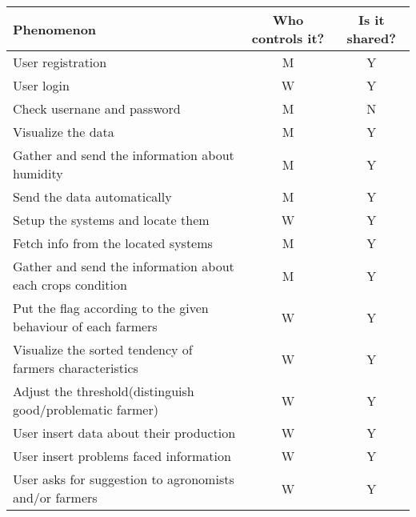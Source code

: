 \begin{table}[H]
    \setlength\arrayrulewidth{1pt}
    \centering
    \begin{tabular}{|l|c|c|}
        \rowcolor{myblue}
        \hline
        \color{white}Phenomenon & \color{white}Who controls it?   & \color{white}Is it shared? \\
        \hline
        User registration                                               &   M   &   Y \\
        \hline
        User login                                                      &   W   &   Y \\
        \hline
        Check usernane and password                                     &   M   &   N \\
        \hline
        Visualize the data                                              &   M   &   Y \\
        \hline
        Gather and send the information about humidity                  &   M   &   Y \\
        \hline
        Send the data automatically                                     &   M   &   Y \\
        \hline
        Setup the systems and locate them                               &   W   &   Y \\
        \hline
        Fetch info from the located systems                             &   M   &   Y \\
        \hline
        Gather and send the information about each crops condition      &   M   &   Y \\
        \hline
        Put the flag according to the given behaviour of each farmers   &   W   &   Y \\
        \hline
        Visualize the sorted tendency of farmers characteristics        &   W   &   Y \\
        \hline
        Adjust the threshold(distinguish good/problematic farmer)       &   W   &   Y \\
        \hline
        User insert data about their production                         &   W   &   Y \\
        \hline
        User insert problems faced information                          &   W   &   Y \\
        \hline
        User asks for suggestion to agronomists and/or farmers          &   W   &   Y \\

\end{tabular}
\end{table}
